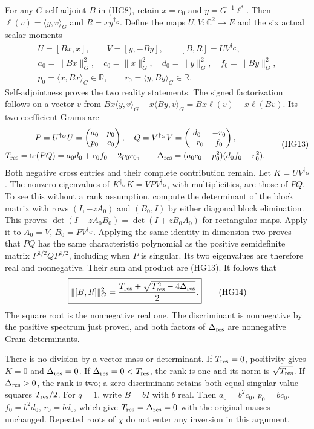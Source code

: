 For any $G$-self-adjoint $B$ in (HG8), retain $x=e_0$ and
$y=G^{-1}\ell^*$. Then $\ell(v)=\langle y,v\rangle_G$ and
$R=xy^{\dagger_G}$. Define the maps $U,V:\mathbb C^2\to E$ and
the six actual scalar moments
\[
\begin{gathered}
 U=[Bx,x],\qquad V=[y,-By],\qquad [B,R]=UV^{\dagger_G},\\
 a_0=\|Bx\|_G^2,\quad c_0=\|x\|_G^2,\quad
 d_0=\|y\|_G^2,\quad f_0=\|By\|_G^2,\\
 p_0=\langle x,Bx\rangle_G\in\mathbb R,\qquad
 r_0=\langle y,By\rangle_G\in\mathbb R .
\end{gathered}\tag{HG12}
\]
Self-adjointness proves the two reality statements. The signed
factorization follows on a vector $v$ from
$Bx\langle y,v\rangle_G-x\langle By,v\rangle_G
=Bx\ell(v)-x\ell(Bv)$. Its two coefficient Grams are
\[
\begin{gathered}
 P=U^{\dagger_G}U=\begin{pmatrix}a_0&p_0\\p_0&c_0\end{pmatrix},
 \quad Q=V^{\dagger_G}V=\begin{pmatrix}d_0&-r_0\\-r_0&f_0\end{pmatrix},\\
 T_{\rm res}=\operatorname{tr}(PQ)=a_0d_0+c_0f_0-2p_0r_0,\qquad
 \Delta_{\rm res}=(a_0c_0-p_0^2)(d_0f_0-r_0^2).
\end{gathered}\tag{HG13}
\]
Both negative cross entries and their complete contribution remain.
Let $K=UV^{\dagger_G}$. The nonzero eigenvalues of
$K^{\dagger_G}K=VPV^{\dagger_G}$, with multiplicities, are those
of $PQ$. To see this without a rank assumption, compute the determinant
of the block matrix with rows $(I,-zA_0)$ and $(B_0,I)$ by either
diagonal block elimination. This proves
$\det(I+zA_0B_0)=\det(I+zB_0A_0)$ for rectangular maps. Apply it to
$A_0=V$, $B_0=PV^{\dagger_G}$.
Applying the same identity in dimension two proves that $PQ$ has the
same characteristic polynomial as the positive semidefinite matrix
$P^{1/2}QP^{1/2}$, including when $P$ is singular. Its two eigenvalues
are therefore real and nonnegative. Their sum and product are (HG13).
It follows that
\[
 \boxed{\|[B,R]\|_G^2=
 \frac{T_{\rm res}+\sqrt{T_{\rm res}^2-4\Delta_{\rm res}}}{2}.}
 \tag{HG14}
\]
The square root is the nonnegative real one. The discriminant is
nonnegative by the positive spectrum just proved, and both factors of
$\Delta_{\rm res}$ are nonnegative Gram determinants.

There is no division by a vector mass or determinant. If
$T_{\rm res}=0$, positivity gives $K=0$ and $\Delta_{\rm res}=0$.
If $\Delta_{\rm res}=0<T_{\rm res}$, the rank is one and its norm
is $\sqrt{T_{\rm res}}$. If $\Delta_{\rm res}>0$, the rank is two;
a zero discriminant retains both equal singular-value squares
$T_{\rm res}/2$. For $q=1$, write $B=bI$ with $b$ real. Then
$a_0=b^2c_0$, $p_0=bc_0$, $f_0=b^2d_0$, $r_0=bd_0$, which give
$T_{\rm res}=\Delta_{\rm res}=0$ with the original masses unchanged.
Repeated roots of $\chi$ do not enter any inversion in this argument.

